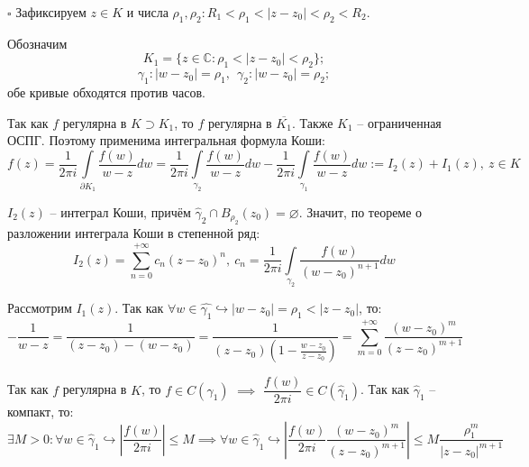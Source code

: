 \documentclass[12pt, a4paper, reqno]{article}
\begin{document}
    $\square$ Зафиксируем $z \in K$ и числа $\rho_1, \rho_2: R_1 < \rho_1 < |z - z_0| < \rho_2 < R_2$.

    Обозначим
    \begin{equation*}
        K_1 = \{z \in \mathbb{C}: \rho_1 < |z - z_0| < \rho_2\};
    \end{equation*}
    \begin{equation*}
        \gamma_1: |w - z_0| = \rho_1,\ \ \gamma_2: |w - z_0| = \rho_2;
    \end{equation*}
    обе кривые обходятся против часов.

    Так как $f$ регулярна в $K \supset K_1$, то $f$ регулярна в $\overline{K_1}$. Также $K_1$ --
    ограниченная ОСПГ. Поэтому применима интегральная формула Коши:
    \begin{equation*}
        f(z) = \frac{1}{2\pi i}\int\limits_{\partial K_1} \frac{f(w)}{w - z}dw =
               \frac{1}{2\pi i}\int\limits_{\gamma_2} \frac{f(w)}{w - z}dw -
               \frac{1}{2\pi i}\int\limits_{\gamma_1} \frac{f(w)}{w - z}dw :=
               I_2(z) + I_1(z),\ z \in K
    \end{equation*}

    $I_2(z)$ -- интеграл Коши, причём $\hat{\gamma}_2 \cap B_{\rho_2}(z_0) = \varnothing$.
    Значит, по теореме о разложении интеграла Коши в степенной ряд:
    \begin{equation*}
        I_2(z) = \sum\limits_{n = 0}^{+\infty} c_n (z - z_0)^n,\
        c_n = \frac{1}{2\pi i}\int\limits_{\gamma_2} \frac{f(w)}{(w - z_0)^{n + 1}}dw
    \end{equation*}

    Рассмотрим $I_1(z)$. Так как $\forall w \in \hat{\gamma_1} \hookrightarrow |w - z_0| =
    \rho_1 < |z - z_0|$, то:
    \begin{equation*}
        -\frac{1}{w - z} = \frac{1}{(z - z_0) - (w - z_0)} =
        \frac{1}{(z - z_0)(1 - \frac{w - z_0}{z - z_0})} =
        \sum\limits_{m = 0}^{+\infty} \frac{(w - z_0)^m}{(z - z_0)^{m + 1}}
    \end{equation*}

    Так как $f$ регулярна в $K$, то $f \in C(\hat{\gamma}_1)$ $\implies$
    $\dfrac{f(w)}{2\pi i} \in C(\hat{\gamma}_1)$. Так как $\hat{\gamma}_1$ -- компакт, то:
    \begin{equation*}
        \exists M > 0: \forall w \in \hat{\gamma}_1 \hookrightarrow
        \left|\frac{f(w)}{2\pi i}\right| \leq M \implies
        \forall w \in \hat{\gamma}_1 \hookrightarrow
        \left|\frac{f(w)}{2\pi i}\frac{(w - z_0)^m}{(z - z_0)^{m + 1}}\right| \leq
        M\frac{\rho_1^m}{|z - z_0|^{m + 1}}
    \end{equation*}
\end{document}
